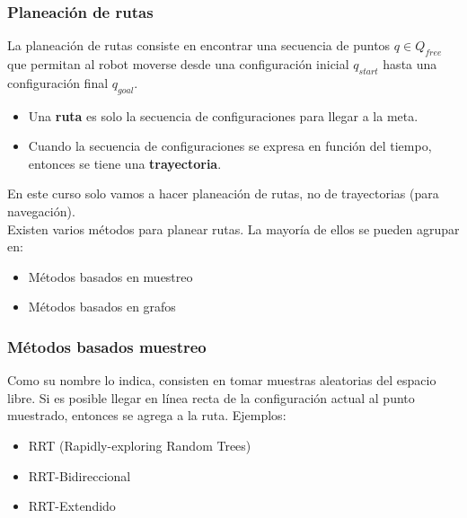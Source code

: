 \begin{frame}\frametitle{Planeación de rutas}
  La planeación de rutas consiste en encontrar una secuencia de puntos $q\in Q_{free}$ que permitan al robot moverse desde una configuración inicial $q_{start}$ hasta una configuración final $q_{goal}$.
  \begin{itemize}
  \item Una \textbf{ruta} es solo la secuencia de configuraciones para llegar a la meta.
  \item Cuando la secuencia de configuraciones se expresa en función del tiempo, entonces se tiene una \textbf{trayectoria}. 
  \end{itemize}
  En este curso solo vamos a hacer planeación de rutas, no de trayectorias (para navegación).\\
  Existen varios métodos para planear rutas. La mayoría de ellos se pueden agrupar en:
  \begin{itemize}
  \item Métodos basados en muestreo
  \item Métodos basados en grafos
  \end{itemize}
\end{frame}

\begin{frame}\frametitle{Métodos basados muestreo}
  Como su nombre lo indica, consisten en tomar muestras aleatorias del espacio libre. Si es posible llegar en línea recta de la configuración actual al punto muestrado, entonces se agrega a la ruta.
  Ejemplos:
  \begin{itemize}
  \item RRT (Rapidly-exploring Random Trees)
  \item RRT-Bidireccional
  \item RRT-Extendido
  \end{itemize}
\end{frame}

